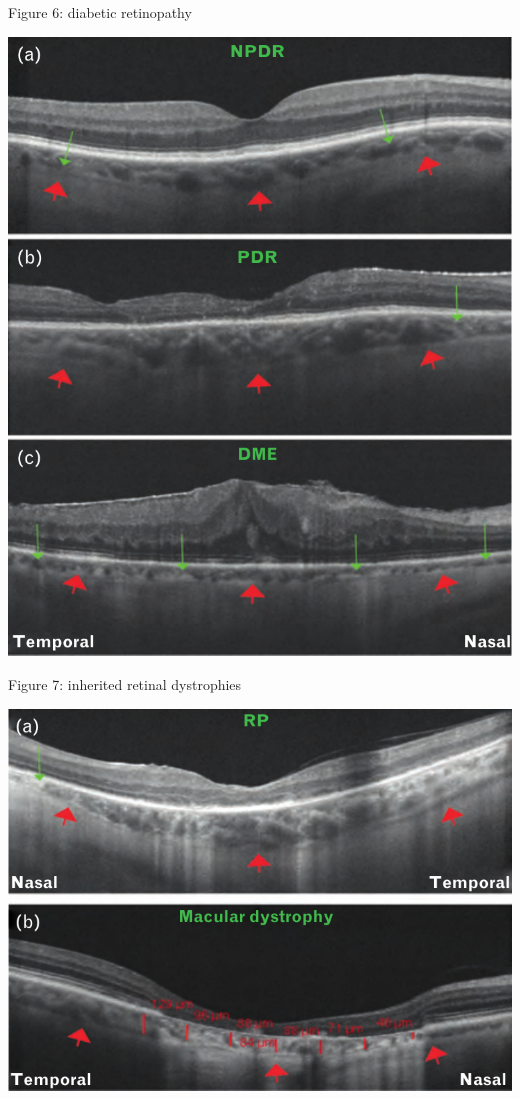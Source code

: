 \documentclass{beamer}
\begin{document}
\begin{frame}{Figure 6: diabetic retinopathy}
    \begin{center}
        \includegraphics[height=0.8\textheight]{6.png}
    \end{center}
\end{frame}

\begin{frame}{Figure 7: inherited retinal dystrophies}
    \begin{center}
        \includegraphics[height=0.8\textheight]{7.png}
    \end{center}
\end{frame}
\end{document}
